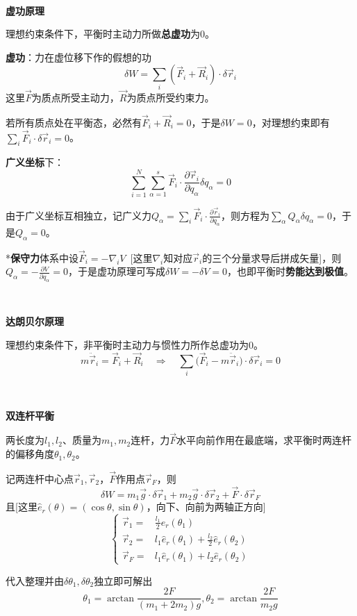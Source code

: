 \documentclass[a4paper,UTF8,fontset=windows]{ctexart}
\begin{document}
\

\textbf{虚功原理}

理想约束条件下，平衡时主动力所做\textbf{总虚功}为0。

\textbf{虚功}：力在虚位移下作的假想的功
$$\delta W=\sum_i(\vec{F}_i+\vec{R}_i)\cdot\delta\vec{r}_i$$
这里$\vec{F}$为质点所受主动力，$\vec{R}$为质点所受约束力。

若所有质点处在平衡态，必然有$\vec{F}_i+\vec{R}_i=0$，于是$\delta W=0$，对理想约束即有$\sum_i\vec{F}_i\cdot\delta\vec{r}_i=0$。

\textbf{广义坐标}下：
$$\sum_{i=1}^N\sum_{\alpha=1}^s\vec{F}_i\cdot\frac{\partial\vec{r}_i}{\partial q_\alpha}\delta q_\alpha=0$$

由于广义坐标互相独立，记广义力$Q_\alpha=\sum_i\vec{F}_i\cdot\frac{\partial\vec{r}_i}{\partial q_\alpha}$，则方程为$\sum_\alpha Q_\alpha\delta q_\alpha=0$，于是$Q_\alpha=0$。

*\textbf{保守力}体系中设$\vec{F}_i=-\nabla_iV$\ [这里$\nabla_i$知对应$\vec{r}_i$的三个分量求导后拼成矢量]，则$Q_\alpha=-\frac{\partial V}{\partial q_\alpha}=0$，于是虚功原理可写成$\delta W=-\delta V=0$，也即平衡时\textbf{势能达到极值}。

\

\textbf{达朗贝尔原理}

理想约束条件下，非平衡时主动力与惯性力所作总虚功为0。
$$m\ddot{\vec{r}}_i=\vec{F}_i+\vec{R}_i\quad\Rightarrow\quad\sum_i\big(\vec{F}_i-m\ddot{\vec{r}}_i\big)\cdot\delta\vec{r}_i=0$$

\

\textbf{双连杆平衡}

两长度为$l_1,l_2$、质量为$m_1,m_2$连杆，力$\vec{F}$水平向前作用在最底端，求平衡时两连杆的偏移角度$\theta_1,\theta_2$。

记两连杆中心点$\vec{r}_1,\vec{r}_2$，$\vec{F}$作用点$\vec{r}_F$，则
$$\delta W=m_1\vec{g}\cdot\delta\vec{r}_1+m_2\vec{g}\cdot\delta\vec{r}_2+\vec{F}\cdot\delta\vec{r}_F$$
且[这里$\hat{e}_r(\theta)=(\cos\theta,\sin\theta)$，向下、向前为两轴正方向]
$$\begin{cases}\vec{r}_1=&\frac{l_1}{2}\hat{e}_r(\theta_1)\\\vec{r}_2=&l_1\hat{e}_r(\theta_1)+\frac{l_2}{2}\hat{e}_r(\theta_2)\\\vec{r}_F=&l_1\hat{e}_r(\theta_1)+l_2\hat{e}_r(\theta_2)\end{cases}$$

代入整理并由$\delta\theta_1,\delta\theta_2$独立即可解出
$$\theta_1=\arctan\frac{2F}{(m_1+2m_2)g},\theta_2=\arctan\frac{2F}{m_2g}$$
\end{document}
